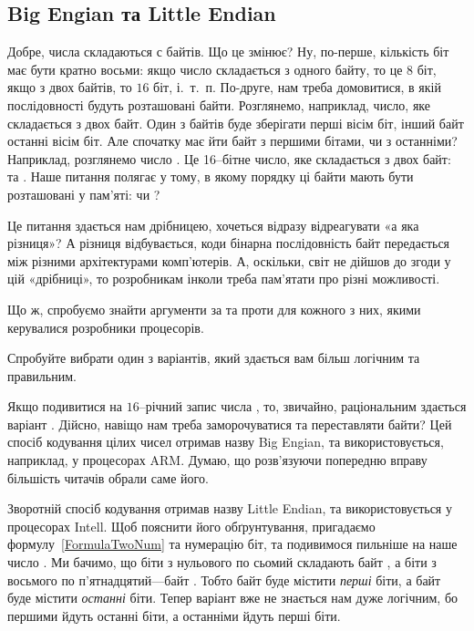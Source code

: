 \subsection{Big Engian та Little Endian}

Добре, числа складаються с байтів.
Що це змінює?
Ну, по-перше, кількість біт має бути кратно восьми: якщо число складається з одного байту, то це $8$ біт, якщо з двох байтів, то $16$ біт, і.~т.~п.
По-друге, нам треба домовитися, в якій послідовності будуть розташовані байти.
Розглянемо, наприклад, число, яке складається з двох байт.
Один з байтів буде зберігати перші вісім біт, інший байт останні вісім біт.
Але спочатку має йти байт з першими бітами, чи з останніми?
Наприклад, розглянемо число .
Це 16--бітне число, яке складається з двох байт:  та .
Наше питання полягає у тому, в якому порядку ці байти мають бути розташовані у пам'яті:  чи ?

Це питання здається нам дрібницею, хочеться відразу відреагувати «а яка різниця»?
А різниця відбувається, коди бінарна послідовність байт передається між різними архітектурами комп'ютерів.
А, оскільки, світ не дійшов до згоди у цій «дрібниці», то розробникам інколи треба пам'ятати про різні можливості.

Що ж, спробуємо знайти аргументи за та проти для кожного з них, якими керувалися розробники процесорів.

\begin{exercise}
Спробуйте вибрати один з варіантів, який здається вам більш логічним та правильним.
\end{exercise}

Якщо подивитися на $16$--річний запис числа , то, звичайно, раціональним здається варіант .
Дійсно, навіщо нам треба заморочуватися та переставляти байти?
Цей спосіб кодування цілих чисел отримав назву Big Engian, та використовується, наприклад, у процесорах ARM.
Думаю, що розв'язуючи попередню вправу більшість читачів обрали саме його.

Зворотній спосіб кодування отримав назву Little Endian, та використовується у процесорах Intell.
Щоб пояснити його обґрунтування, пригадаємо формулу~\ref{FormulaTwoNum} та нумерацію біт, та подивимося пильніше на наше число .
Ми бачимо, що біти з нульового по сьомий складають байт , а біти з восьмого по п'ятнадцятий---байт .
Тобто байт  буде містити \textit{перші} біти, а байт  буде містити \textit{останні} біти.
Тепер варіант  вже не знається нам дуже логічним, бо першими йдуть останні біти, а останніми йдуть перші біти.

